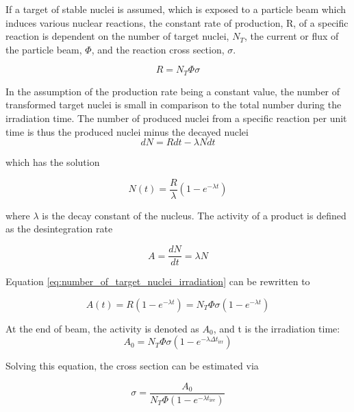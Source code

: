 If a target of stable nuclei is assumed, which is exposed to a particle beam which induces various nuclear reactions, the constant rate of production, R, of a specific reaction is dependent on the number of target nuclei, $N_T$, the current or flux of the particle beam, $\Phi$, and the reaction cross section, $\sigma$.  

\begin{equation}
    R = N_T \Phi \sigma
\end{equation}

In the assumption of the production rate being a constant value, the number of transformed target nuclei is small in comparison to the total number during the irradiation time. The number of produced nuclei from a specific reaction per unit time is thus the produced nuclei minus the decayed nuclei
\begin{equation}
    dN = Rdt - \lambda N dt
\end{equation}

which has the solution

\begin{equation} \label{eq:number_of_target_nuclei_irradiation}
    N(t) = \frac{R}{\lambda}(1-e^{-\lambda t})
\end{equation}

where $\lambda$ is the decay constant of the nucleus. The activity of a product is defined as the desintegration rate 

\begin{equation} \label{eq:activity_dN/dt_lambdaN}
    A= \frac{dN}{dt} = \lambda N
\end{equation}

Equation \ref{eq:number_of_target_nuclei_irradiation} can be rewritten to

\begin{equation} 
    A(t) = R(1-e^{-\lambda t}) = N_T \Phi \sigma (1-e^{-\lambda t})
\end{equation}

At the end of beam, the activity is denoted as $A_0$, and t is the irradiation time:
\begin{equation} \label{eq:activity_eob}
    A_0 = N_T \Phi \sigma (1-e^{-\lambda \Delta t_\text{irr}})
\end{equation}

Solving this equation, the cross section can be estimated via

\begin{equation}
    \sigma = \frac{A_0}{N_T \Phi (1-e^{-\lambda t_\text{iee}})}
\end{equation}

